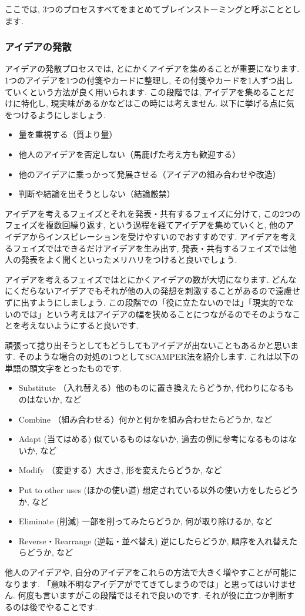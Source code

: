 ここでは, 3つのプロセスすべてをまとめてブレインストーミングと呼ぶこととします. 
\subsubsection{アイデアの発散}
アイデアの発散プロセスでは, とにかくアイデアを集めることが重要になります. 1つのアイデアを1つの付箋やカードに整理し, その付箋やカードを1人ずつ出していくという方法が良く用いられます. 
この段階では, アイデアを集めることだけに特化し, 現実味があるかなどはこの時には考えません.
以下に挙げる点に気をつけるようにしましょう. 
\begin{itemize}
    \item 量を重視する（質より量）
    \item 他人のアイデアを否定しない（馬鹿げた考え方も歓迎する）
    \item 他のアイデアに乗っかって発展させる（アイデアの組み合わせや改造）
    \item 判断や結論を出そうとしない（結論厳禁）
\end{itemize}

アイデアを考えるフェイズとそれを発表・共有するフェイズに分けて, この2つのフェイズを複数回繰り返す, という過程を経てアイデアを集めていくと, 他のアイデアからインスピレーションを受けやすいのでおすすめです. アイデアを考えるフェイズではできるだけアイデアを生み出す, 発表・共有するフェイズでは他人の発表をよく聞くといったメリハリをつけると良いでしょう. 

アイデアを考えるフェイズではとにかくアイデアの数が大切になります. どんなにくだらないアイデアでもそれが他の人の発想を刺激することがあるので遠慮せずに出すようにしましょう. この段階での「役に立たないのでは」「現実的でないのでは」という考えはアイデアの幅を狭めることにつながるのでそのようなことを考えないようにすると良いです. 

頑張って捻り出そうとしてもどうしてもアイデアが出ないこともあるかと思います. そのような場合の対処の1つとしてSCAMPER法を紹介します. これは以下の単語の頭文字をとったものです. 
\begin{itemize}
    \item Substitute （入れ替える）他のものに置き換えたらどうか, 代わりになるものはないか, など
    \item Combine （組み合わせる）何かと何かを組み合わせたらどうか, など
    \item Adapt (当てはめる) 似ているものはないか, 過去の例に参考になるものはないか, など
    \item Modify （変更する）大きさ, 形を変えたらどうか, など
    \item Put to other uses (ほかの使い道) 想定されている以外の使い方をしたらどうか, など
    \item Eliminate (削減) 一部を削ってみたらどうか, 何が取り除けるか, など
    \item Reverse・Rearrange (逆転・並べ替え) 逆にしたらどうか, 順序を入れ替えたらどうか, など
\end{itemize}
他人のアイデアや, 自分のアイデアをこれらの方法で大きく増やすことが可能になります. 「意味不明なアイデアがでてきてしまうのでは」と思ってはいけません. 何度も言いますがこの段階ではそれで良いのです. それが役に立つか判断するのは後でやることです.  

